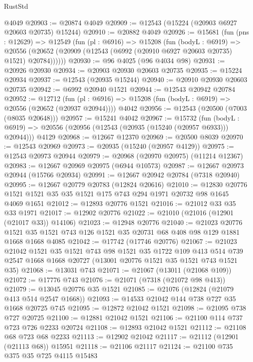 \begin{lexlean}{RustStd}
\begin{coremodule}
    @4049
@20903 := @20874 @4049
@20909 := @12543 (@15224 (@20903 @6927 @20603 @20735) @15244)
@20910 := @20882 @4049
@20926 := @15681
    (fun (pns : @12629) =>
    @12549
      (fun (pl : @6916) =>
      @15208
        (fun (bodyL : @6919) =>
        @20556 (@20652 (@20909 (@12543 (@6992 (@20910 @6927 @20603 @20735) @1521) @20784))))))
@20930 := @96 @4025 (@96 @4034 @98)
@20931 := @20926 @20930
@20934 := @20903 @20930 @20603 @20735
@20935 := @15224 @20934
@20937 := @12543 (@20935 @15244)
@20940 := @20910 @20930 @20603 @20735
@20942 := @6992 @20940 @1521
@20944 := @12543 @20942 @20784
@20952 := @12712
    (fun (pl : @6916) => @15208 (fun (bodyL : @6919) => @20556 (@20652 (@20937 @20944))))
    @4042
@20956 := @12543 (@20500 (@7003 (@8035 @20648)))
@20957 := @15241 @4042
@20967 := @15732
    (fun (bodyL : @6919) => @20556 (@20956 (@12543 (@20935 (@15240 (@20957 @6933))) @20944)))
    @4129
@20968 := @12667 @12370
@20969 := @20500 @8039
@20970 := @12543 @20969
@20973 := @20935 (@15240 (@20957 @4129))
@20975 := @12543 @20973 @20944
@20979 := @20968 (@20970 @20975) (@11214 @12367)
@20983 := @12667 @20969 @20975 (@6944 @10573)
@20987 := @12667 @20973 @20944 (@15766 @20934)
@20991 := @12667 @20942 @20784 (@7318 @20940)
@20995 := @12667 @20779 @20783 (@12824 @20616)
@21010 := @12830 @20776 @1521 @1521 @35 @35 @1521 @175 @743 @294 @1971 @20732 @98 @1645 @4069 @1651
@21012 := @12893 @20776 @1521
@21016 := @21012 @33 @35 @33 @1971
@21017 := @12902 @20776
@21022 := @21010 (@21016 (@12901 (@21017 @33)) @14106)
@21023 := @12948 @20776
@21040 := @21023
    @20776
    @1521
    @35
    @1521
    @743
    @126
    @1521
    @35
    @20731
    @68
    @408
    @98
    @129
    @1881
    @1668
    @1668
    @4085
@21042 := @17742 (@17746 @20776)
@21067 := @21023
    @21042
    @1521
    @35
    @1521
    @743
    @98
    @1521
    @35
    @1722
    @109
    @413
    @514
    @739
    @2547
    @1668
    @1668
    @20727
    (@13001 @20776 @1521 @35 @1521 @743 @1521 @35)
@21068 := @13031 @743
@21071 := @21067 (@13011 (@21068 @109))
@21072 := @17776 @743
@21076 := @21071 (@7318 (@21072 @98 @413))
@21079 := @13045 @20776 @35 @1521
@21085 := @21076 (@12824 (@21079 @413 @514 @2547 @1668))
@21093 := @14533 @21042 @144 @738 @727 @35 @1668 @20725 @745
@21095 := @12872 @21042 @1521
@21098 := @21095 @738 @727 @20725
@21100 := @12881 @21042 @1521
@21106 := @21100 @114 @737 @723 @726 @2233 @20724
@21108 := @12893 @21042 @1521
@21112 := @21108 @68 @723 @68 @2233
@21113 := @12902 @21042
@21117 := @21112 (@12901 (@21113 @68)) @15951
@21118 := @21106 @21117
@21124 := @21100 @735 @375 @35 @725 @4115 @15483

\end{coremodule}
\end{lexlean}
